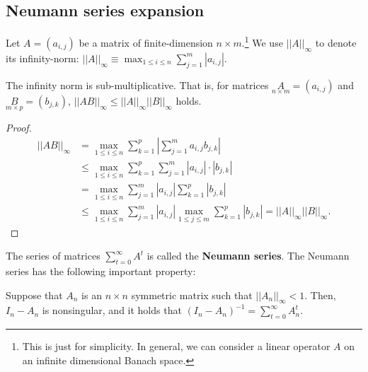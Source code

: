 \documentclass[11pt, A4paper, openany, uplatex]{book}
\begin{document}
\begin{appendices}
\section{Neumann series expansion}\label{sec:neumann}
Let $A = (a_{i,j})$ be a matrix of finite-dimension $n \times m$.\footnote{
	This is just for simplicity.
	In general, we can consider a linear operator $A$ on an infinite dimensional Banach space.
}
We use $||A||_\infty$ to denote its infinity-norm: $||A||_\infty \equiv \max_{1 \le i \le n}\sum_{j = 1}^m |a_{i,j}|$.

\begin{lemma}
	The infinity norm is sub-multiplicative.
	That is, for matrices $\underset{n \times m}{A} = (a_{i,j})$ and $\underset{m \times p}{B} = (b_{j,k})$, $||A B ||_\infty \le ||A||_\infty ||B||_\infty$ holds.
\end{lemma}

\begin{proof}
	\begin{align*}
	||A B ||_\infty
	& = \max_{1 \le i \le n}\sum_{k = 1}^p \left| \sum_{j = 1}^m a_{i,j} b_{j,k} \right| \\
	& \le \max_{1 \le i \le n}\sum_{k = 1}^p \sum_{j = 1}^m | a_{i,j}| \cdot |b_{j,k}| \\
	& =\max_{1 \le i \le n} \sum_{j = 1}^m | a_{i,j}| \sum_{k = 1}^p |b_{j,k}| \\
	& \le \max_{1 \le i \le n} \sum_{j = 1}^m | a_{i,j}| \max_{1 \le j \le m} \sum_{k = 1}^p |b_{j,k}| = ||A ||_\infty ||B||_\infty.
	\end{align*}
\end{proof}

The series of matrices $\sum_{t = 0}^\infty A^t$ is called the \textbf{Neumann series}.
The Neumann series has the following important property:
\begin{lemma}\label{lem:neumann}
	Suppose that $A_n$ is an $n \times n$ symmetric matrix such that $||A_n||_\infty < 1$.
	Then, $I_n - A_n$ is nonsingular, and it holds that $(I_n - A_n)^{-1} = \sum_{t = 0}^\infty A_n^t$.
\end{lemma}


\end{appendices}
\end{document}
